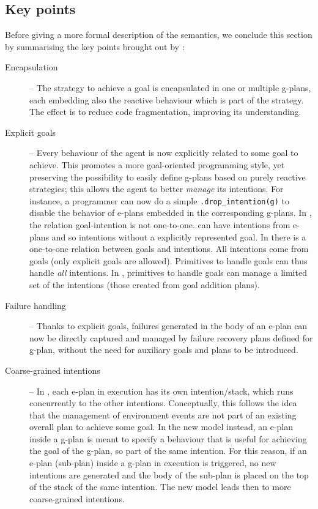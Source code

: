 \subsection{Key points}

Before giving a more formal description of the semantics, we conclude
this section by summarising the key points brought out by {\aser}:
%
\begin{description}
%
\item[Encapsulation] -- The strategy to achieve a goal is encapsulated
  in one or multiple g-plans, each embedding also the reactive
  behaviour which is part of the strategy.
%
  The effect is to reduce code fragmentation, improving its
  understanding.
%
\item[Explicit goals] -- Every behaviour of the agent is now
  explicitly related to some goal to achieve.
%
  This promotes a more goal-oriented programming style, yet preserving
  the possibility to easily define g-plans based on purely reactive
  strategies;
%
  this allows the agent to better \emph{manage} its intentions. For
  instance, a programmer can now do a simple
  \texttt{.drop\_intention(g)} to disable the behavior of e-plans
  embedded in the corresponding g-plans.
%
In {\asl}, the relation goal-intention is not one-to-one. {\asl} can have intentions from e-plans and so intentions without a explicitly represented goal. 
In {\aser} there is a one-to-one relation between goals and intentions. 
%
All intentions come from goals (only explicit goals are allowed). 
%
Primitives to handle goals can thus handle \emph{all} intentions. 
%
In {\asl}, primitives to handle goals can manage a limited set of the
intentions (those created from goal addition plans).


\item[Failure handling] -- Thanks to explicit goals, failures
  generated in the body of an e-plan can now be directly captured and
  managed by failure recovery plans defined for g-plan, without the
  need for auxiliary goals and plans to be introduced.

\item[Coarse-grained intentions] -- In {\asl}, each e-plan in
  execution has its own intention/stack, which runs concurrently to
  the other intentions. Conceptually, this follows the idea that
  the management of environment events are not part of an existing
  overall plan to achieve some goal.
%
  In the new model instead, an e-plan inside a g-plan is meant to
  specify a behaviour that is useful for achieving the goal of the
  g-plan, so part of the same intention.
%
  For this reason, if an e-plan (sub-plan) inside a g-plan in
  execution is triggered, no new intentions are generated and the body
  of the sub-plan is placed on the top of the stack of the same
  intention.
%
  The new model leads then to more coarse-grained intentions.
%
%
\end{description}
